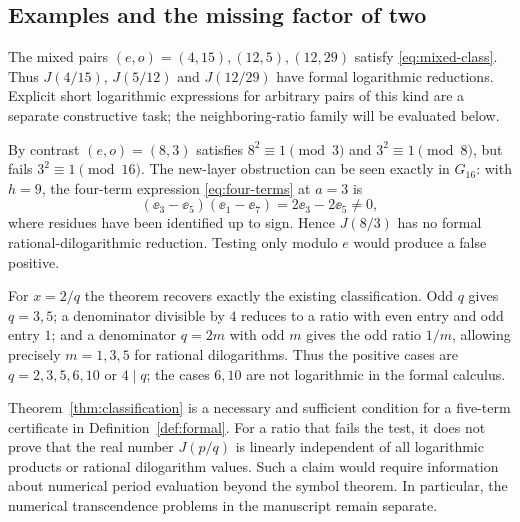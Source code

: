 \subsection{Examples and the missing factor of two}

The mixed pairs $(e,o)=(4,15),(12,5),(12,29)$ satisfy
\eqref{eq:mixed-class}. Thus $J(4/15)$, $J(5/12)$ and $J(12/29)$ have
formal logarithmic reductions. Explicit short logarithmic expressions
for arbitrary pairs of this kind are a separate constructive task;
the neighboring-ratio family will be evaluated below.

By contrast $(e,o)=(8,3)$ satisfies
$8^2\equiv1\pmod3$ and $3^2\equiv1\pmod8$, but fails
$3^2\equiv1\pmod{16}$. The new-layer obstruction can be seen exactly
in $G_{16}$: with $h=9$, the four-term expression
\eqref{eq:four-terms} at $a=3$ is
\[
 (\ee_3-\ee_5)(\ee_1-\ee_7)=2\ee_3-2\ee_5\ne0,
\]
where residues have been identified up to sign. Hence $J(8/3)$ has no
formal rational-dilogarithmic reduction. Testing only modulo $e$ would
produce a false positive.

For $x=2/q$ the theorem recovers exactly the existing classification.
Odd $q$ gives $q=3,5$; a denominator divisible by $4$ reduces to a ratio
with even entry and odd entry $1$; and a denominator $q=2m$ with odd
$m$ gives the odd ratio $1/m$, allowing precisely $m=1,3,5$ for rational
dilogarithms. Thus the positive cases are $q=2,3,5,6,10$ or $4\mid q$;
the cases $6,10$ are not logarithmic in the formal calculus.

\begin{remark}\label{rem:periods}
Theorem~\ref{thm:classification} is a necessary and sufficient condition
for a five-term certificate in Definition~\ref{def:formal}. For a ratio
that fails the test, it does not prove that the real number $J(p/q)$ is
linearly independent of all logarithmic products or rational dilogarithm
values. Such a claim would require information about numerical period
evaluation beyond the symbol theorem. In particular, the numerical
transcendence problems in the manuscript remain separate.
\end{remark}
